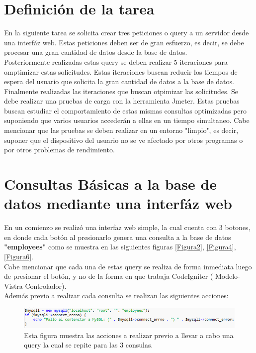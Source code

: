 \section{Definición de la tarea} \label{tarea}

En la siguiente tarea se solicita crear tres peticiones o query a un servidor desde una interfáz web. Estas peticiones deben ser de gran esfuerzo, es decir, se debe procesar una gran cantidad de datos desde la base de datos.\\

Posteriormente realizadas estas query se deben realizar 5 iteraciones para omptimizar estas solicitudes. Estas iteraciones buscan reducir los tiempos de espera del usuario que solicita la gran cantidad de datos a la base de datos.\\

Finalmente realizadas las iteraciones que buscan otpimizar las solicitudes. Se debe realizar una pruebas de carga con la herramienta Jmeter. Estas pruebas buscan estudiar el comportamiento de estas mismas consultas optimizadas pero suponiendo que varios usuarios accederán a ellas en un tiempo simultaneo. Cabe mencionar que las pruebas se deben realizar en un entorno "limpio", es decir, suponer que el dispositivo del usuario no se ve afectado por otros programas o por otros problemas de rendimiento. \\

\section{Consultas Básicas a la base de datos mediante una interfáz web}

En un comienzo se realizó una interfaz web simple, la cual cuenta con 3 botones, en donde cada botón al presionarlo genera una consulta a la base de datos \textbf{"employees"} como se muestra en las siguientes figuras \ref{Figura2}, \ref{Figura4}, \ref{Figura6}. \\ 
Cabe mencionar que cada una de estas query se realiza de forma inmediata luego de presionar el botón, y no de la forma en que trabaja CodeIgniter ( Modelo-Vistra-Controlador). \\
Además previo a realizar cada consulta se realizan las siguientes acciones: 

\begin{figure}[htb]
	\label{Figura0}
	\begin{center}
		\includegraphics[scale=0.5]{imagenes/acciones.png}
	\end{center}
	\caption{Esta figura muestra las acciones a realizar previo a llevar a cabo una query la cual se repite para las 3 consulas.}
\end{figure}

